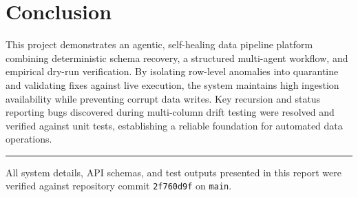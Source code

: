 \documentclass[11pt]{article}
\newcommand{\code}[1]{\texttt{\small #1}}
\begin{document}
\section{Conclusion}
This project demonstrates an agentic, self-healing data pipeline platform combining deterministic schema recovery, a structured multi-agent workflow, and empirical dry-run verification. By isolating row-level anomalies into quarantine and validating fixes against live execution, the system maintains high ingestion availability while preventing corrupt data writes. Key recursion and status reporting bugs discovered during multi-column drift testing were resolved and verified against unit tests, establishing a reliable foundation for automated data operations.

\bigskip
\noindent\rule{\textwidth}{0.4pt}

\footnotesize
All system details, API schemas, and test outputs presented in this report were verified against repository commit \code{2f760d9f} on \code{main}.
\end{document}
